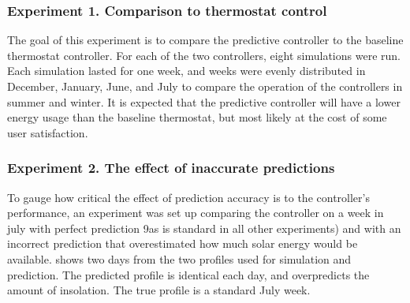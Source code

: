 \subsubsection{Experiment 1. Comparison to thermostat control}

The goal of this experiment is to compare the predictive controller to the baseline thermostat controller.
For each of the two controllers, eight simulations were run.
Each simulation lasted for one week, and weeks were evenly distributed in December, January, June, and July to compare the operation of the controllers in summer and winter.
It is expected that the predictive controller will have a lower energy usage than the baseline thermostat, but most likely at the cost of some user satisfaction.

\subsubsection{Experiment 2. The effect of inaccurate predictions}

To gauge how critical the effect of prediction accuracy is to the controller's performance, an experiment was set up comparing the controller on a week in july with perfect prediction 9as is standard in all other experiments) and with an incorrect prediction that overestimated how much solar energy would be available.
 shows two days from the two profiles used for simulation and prediction.
The predicted profile is identical each day, and overpredicts the amount of insolation.
The true profile is a standard July week.


